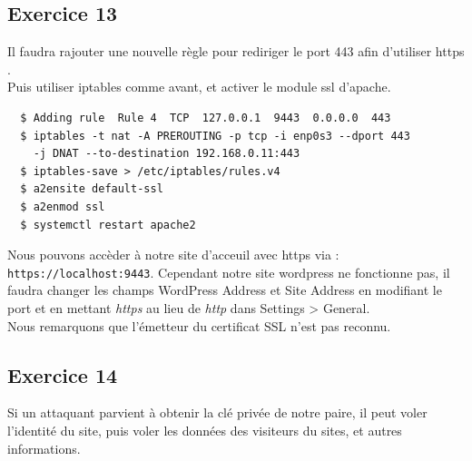 \documentclass{report}
\begin{document}
\subsection{Exercice 13}
Il faudra rajouter une nouvelle règle pour rediriger le port 443 afin d'utiliser https .\\
Puis utiliser iptables comme avant, et activer le module ssl d'apache.
\begin{tcolorbox}
  \begin{verbatim}
  $ Adding rule  Rule 4  TCP  127.0.0.1  9443  0.0.0.0  443
  $ iptables -t nat -A PREROUTING -p tcp -i enp0s3 --dport 443
    -j DNAT --to-destination 192.168.0.11:443
  $ iptables-save > /etc/iptables/rules.v4
  $ a2ensite default-ssl
  $ a2enmod ssl
  $ systemctl restart apache2
  \end{verbatim}
\end{tcolorbox}
Nous pouvons accèder à notre site d'acceuil avec https via : \texttt{https://localhost:9443}.
Cependant notre site wordpress ne fonctionne pas, il faudra changer les champs WordPress Address
et Site Address en modifiant le port et en mettant \textit{https} au lieu de \textit{http} dans
Settings > General.\\
Nous remarquons que l'émetteur du certificat SSL n'est pas reconnu.\\

\subsection{Exercice 14}
Si un attaquant parvient à obtenir la clé privée de notre paire, il peut voler l'identité du site,
puis voler les données des visiteurs du sites, et autres informations.

\begin{tcolorbox}
  \begin{verbatim}
  \end{verbatim}
\end{tcolorbox}
\end{document}
